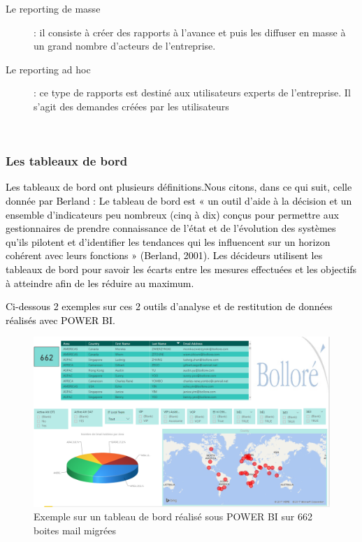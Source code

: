 \begin{description}
	\item[Le reporting de masse] : il consiste à créer des rapports à l’avance et puis les diffuser en masse à un grand nombre d’acteurs de l’entreprise.
	\item[Le reporting ad hoc] : ce type de rapports est destiné aux utilisateurs experts de l’entreprise.
    Il s’agit des demandes créées par les utilisateurs
\end{description}

~~\\
\subsubsection*{Les tableaux de bord  }

\textcolor{black}{Les tableaux de bord  ont plusieurs définitions.Nous citons, dans ce qui suit, celle donnée par Berland : Le tableau de bord est « un outil d’aide à la décision et un ensemble d’indicateurs peu nombreux (cinq à dix) conçus pour permettre aux gestionnaires de prendre connaissance de l’état et de l’évolution des systèmes qu’ils pilotent et d’identifier les tendances qui les influencent sur un horizon cohérent avec leurs fonctions » (Berland, 2001). Les décideurs utilisent les tableaux de bord pour savoir les écarts entre les mesures effectuées et les objectifs à atteindre afin de les réduire au maximum.}

\textcolor{black}{Ci-dessous 2 exemples sur ces 2 outils d’analyse et de restitution de données réalisés avec POWER BI.}

\begin{figure}[H]
	\begin{center}
		\includegraphics[width=1\linewidth]{Projet_O365/TB}
\end{center}
	\caption{Exemple sur un tableau de bord réalisé sous POWER BI sur 662 boites mail migrées}
	\label{fig:19}	
\end{figure}

